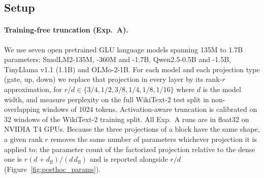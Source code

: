 \documentclass{article}
\begin{document}
\subsection{Setup}
\label{sec:setup}

\paragraph{Training-free truncation (Exp.~A).} We use seven open pretrained GLU language models spanning
135M to 1.7B parameters: SmolLM2-135M, -360M and -1.7B, Qwen2.5-0.5B and -1.5B, TinyLlama v1.1 (1.1B) and
OLMo-2-1B. %
For each model and each projection type (gate, up, down) we replace that projection in every layer by its
rank-$r$ approximation, for $r/d \in \{3/4, 1/2, 3/8, 1/4, 1/8, 1/16\}$ where $d$ is the model width, and
measure perplexity on the full WikiText-2 test split in non-overlapping windows of 1024 tokens.
Activation-aware truncation is calibrated on 32 windows of the WikiText-2 training split. All Exp.~A runs
are in float32 on NVIDIA T4 GPUs. Because the three projections of a block have the same shape, a given
rank $r$ removes the same number of parameters whichever projection it is applied to; the parameter count
of the factorized projection relative to the dense one is $r(d + d_{\mathrm{ff}}) / (d\, d_{\mathrm{ff}})$
and is reported alongside $r/d$ (Figure~\ref{fig:posthoc_params}).
\end{document}
